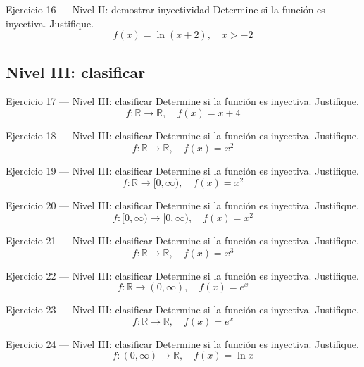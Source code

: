 \documentclass[aspectratio=169,10pt]{beamer}
\begin{document}
\begin{frame}{Ejercicio 16 — Nivel II: demostrar inyectividad}
Determine si la función es inyectiva. Justifique.
\[
f(x)=\ln(x+2),\quad x>-2
\]
\end{frame}

\subsection{Nivel III: clasificar}
\begin{frame}{Ejercicio 17 — Nivel III: clasificar}
Determine si la función es inyectiva. Justifique.
\[
f:\mathbb{R}\to\mathbb{R},\quad f(x)=x+4
\]
\end{frame}

\begin{frame}{Ejercicio 18 — Nivel III: clasificar}
Determine si la función es inyectiva. Justifique.
\[
f:\mathbb{R}\to\mathbb{R},\quad f(x)=x^2
\]
\end{frame}

\begin{frame}{Ejercicio 19 — Nivel III: clasificar}
Determine si la función es inyectiva. Justifique.
\[
f:\mathbb{R}\to[0,\infty),\quad f(x)=x^2
\]
\end{frame}

\begin{frame}{Ejercicio 20 — Nivel III: clasificar}
Determine si la función es inyectiva. Justifique.
\[
f:[0,\infty)\to[0,\infty),\quad f(x)=x^2
\]
\end{frame}

\begin{frame}{Ejercicio 21 — Nivel III: clasificar}
Determine si la función es inyectiva. Justifique.
\[
f:\mathbb{R}\to\mathbb{R},\quad f(x)=x^3
\]
\end{frame}

\begin{frame}{Ejercicio 22 — Nivel III: clasificar}
Determine si la función es inyectiva. Justifique.
\[
f:\mathbb{R}\to(0,\infty),\quad f(x)=e^x
\]
\end{frame}

\begin{frame}{Ejercicio 23 — Nivel III: clasificar}
Determine si la función es inyectiva. Justifique.
\[
f:\mathbb{R}\to\mathbb{R},\quad f(x)=e^x
\]
\end{frame}

\begin{frame}{Ejercicio 24 — Nivel III: clasificar}
Determine si la función es inyectiva. Justifique.
\[
f:(0,\infty)\to\mathbb{R},\quad f(x)=\ln x
\]
\end{frame}
\end{document}

